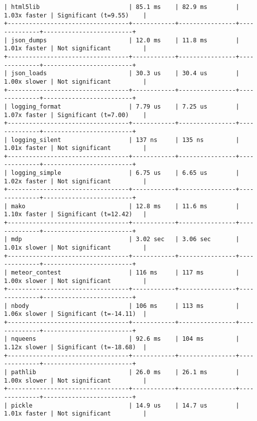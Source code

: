 \begin{code}
\begin{verbatim}
| html5lib                         | 85.1 ms    | 82.9 ms        | 1.03x faster | Significant (t=9.55)    |
+----------------------------------+------------+----------------+--------------+-------------------------+
| json_dumps                       | 12.0 ms    | 11.8 ms        | 1.01x faster | Not significant         |
+----------------------------------+------------+----------------+--------------+-------------------------+
| json_loads                       | 30.3 us    | 30.4 us        | 1.00x slower | Not significant         |
+----------------------------------+------------+----------------+--------------+-------------------------+
| logging_format                   | 7.79 us    | 7.25 us        | 1.07x faster | Significant (t=7.00)    |
+----------------------------------+------------+----------------+--------------+-------------------------+
| logging_silent                   | 137 ns     | 135 ns         | 1.01x faster | Not significant         |
+----------------------------------+------------+----------------+--------------+-------------------------+
| logging_simple                   | 6.75 us    | 6.65 us        | 1.02x faster | Not significant         |
+----------------------------------+------------+----------------+--------------+-------------------------+
| mako                             | 12.8 ms    | 11.6 ms        | 1.10x faster | Significant (t=12.42)   |
+----------------------------------+------------+----------------+--------------+-------------------------+
| mdp                              | 3.02 sec   | 3.06 sec       | 1.01x slower | Not significant         |
+----------------------------------+------------+----------------+--------------+-------------------------+
| meteor_contest                   | 116 ms     | 117 ms         | 1.00x slower | Not significant         |
+----------------------------------+------------+----------------+--------------+-------------------------+
| nbody                            | 106 ms     | 113 ms         | 1.06x slower | Significant (t=-14.11)  |
+----------------------------------+------------+----------------+--------------+-------------------------+
| nqueens                          | 92.6 ms    | 104 ms         | 1.12x slower | Significant (t=-18.68)  |
+----------------------------------+------------+----------------+--------------+-------------------------+
| pathlib                          | 26.0 ms    | 26.1 ms        | 1.00x slower | Not significant         |
+----------------------------------+------------+----------------+--------------+-------------------------+
| pickle                           | 14.9 us    | 14.7 us        | 1.01x faster | Not significant         |

\end{verbatim}
\end{code}
